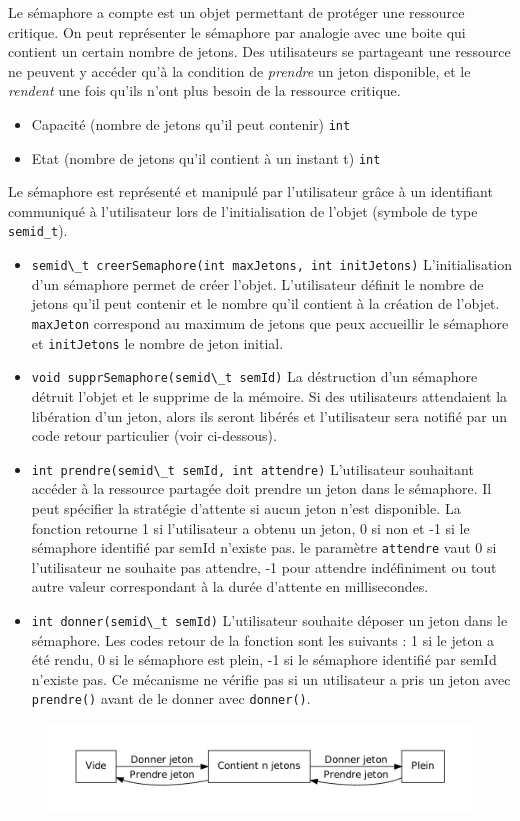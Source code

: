 {
Le sémaphore a compte est un objet permettant de protéger une ressource
critique. On peut représenter le sémaphore par analogie avec une boite qui
contient un certain nombre de jetons. Des utilisateurs se partageant une
ressource ne peuvent y accéder qu'à la condition de \emph{prendre} un jeton
disponible, et le \emph{rendent} une fois qu'ils n'ont plus besoin de la
ressource critique.
}
{
\begin{itemize}
	\item Capacité (nombre de jetons qu'il peut contenir) \lstinline {int}
	\item Etat (nombre de jetons qu'il contient à un instant t) \lstinline {int}
\end{itemize}

Le sémaphore est représenté et manipulé par l'utilisateur grâce à un
identifiant communiqué à l'utilisateur lors de l'initialisation de l'objet
(symbole de type \texttt{semid\_t}).
}
{
\begin{itemize}
	\item \lstinline {semid\_t creerSemaphore(int maxJetons, int initJetons)}
L'initialisation d'un sémaphore permet de créer l'objet. L'utilisateur définit
le nombre de jetons qu'il peut contenir et le nombre qu'il contient à la
création de l'objet. \texttt{maxJeton} correspond au maximum de jetons que peux
accueillir le sémaphore et \texttt{initJetons} le nombre de jeton initial.
	\item \lstinline {void supprSemaphore(semid\_t semId)} La déstruction d'un
sémaphore détruit l'objet et le supprime de la mémoire. Si des utilisateurs
attendaient la libération d'un jeton, alors ils seront libérés et l'utilisateur
sera notifié par un code retour particulier (voir ci-dessous).
	\item \lstinline {int prendre(semid\_t semId, int attendre)} L'utilisateur
souhaitant accéder à la ressource partagée doit prendre un jeton dans le
sémaphore. Il peut spécifier la stratégie d'attente si aucun jeton n'est
disponible. La fonction retourne 1 si l'utilisateur a obtenu un jeton, 0 si non
et -1 si le sémaphore identifié par semId n'existe pas. le paramètre
\texttt{attendre} vaut 0 si l'utilisateur ne souhaite pas attendre, -1 pour
attendre indéfiniment ou tout autre valeur correspondant à la durée d'attente
en millisecondes.
	\item \lstinline {int donner(semid\_t semId)} L'utilisateur souhaite
déposer un jeton dans le sémaphore. Les codes retour de la fonction sont les
suivants : 1 si le jeton a été rendu, 0 si le sémaphore est plein, -1 si le
sémaphore identifié par semId n'existe pas. Ce mécanisme ne vérifie pas si un
utilisateur a pris un jeton avec \texttt{prendre()} avant de le donner avec
\texttt{donner()}.
\end{itemize}
}
{
\begin{figure} [htp]
\centering
\includegraphics[width=\textwidth]{img/etatSemaphoreACompte.pdf}
\end{figure}
}
{
}
